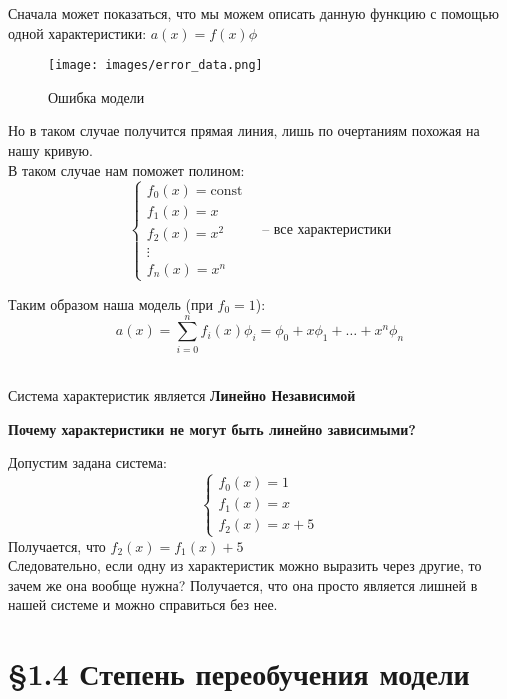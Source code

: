 Сначала может показаться, что мы можем описать данную функцию с
помощью одной характеристики: \(a(x) = f(x) \phi\) \\
\begin{figure}[htbp]
    \centering
    \texttt{[image: images/error\_data.png]}
    \caption{Ошибка модели}
    \label{fig:example_error_of_model}
\end{figure}
Но в таком случае получится прямая линия, лишь по очертаниям похожая на нашу кривую. \\
\vspace{0.7cm}
В таком случае нам поможет полином:
\[
\begin{cases}
    f_0(x) = \text{const} \\
    f_1(x) = x \\
    f_2(x) = x^2 \\
    \vdots \\
    f_n(x) = x^n
\end{cases}
\quad \textbf{-- все характеристики}
\]

Таким образом наша модель (при \(f_0 = 1\)):
\[
a(x) = \sum_{i=0}^n f_i(x) \phi_i = \phi_0 + x\phi_1 + \ldots + x^n \phi_n
\] \\
\begin{tcolorbox}[colback=gray!10, colframe=black, title=Важно]
    Система характеристик является \textbf{Линейно Независимой} \\
\end{tcolorbox}

\textbf{Почему характеристики не могут быть линейно зависимыми?} \\
\vspace{0.5cm}

Допустим задана система:
\[
    \begin{cases}
        f_0(x) = 1 \\
        f_1(x) = x \\
        f_2(x) = x + 5
    \end{cases}
\]
Получается, что \(f_2(x) = f_1(x) + 5\) \\
Следовательно, если одну из характеристик можно выразить через другие, то зачем же она вообще нужна? Получается, что
она просто является лишней в нашей системе и можно справиться без нее.


\newpage
\centering
\section*{\S 1.4 Степень переобучения модели}
\vspace{0.8cm}
\raggedright

